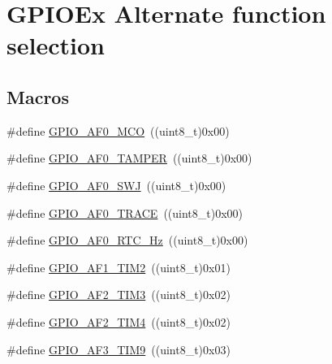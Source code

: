 \hypertarget{group___g_p_i_o_ex___alternate__function__selection}{\section{G\-P\-I\-O\-Ex Alternate function selection}
\label{group___g_p_i_o_ex___alternate__function__selection}
}
\subsection*{Macros}
\begin{DoxyCompactItemize}
\item 
\#define \hyperlink{group___g_p_i_o_ex___alternate__function__selection_ga2c2c2ebb2b09db35be06740566eeda5d}{G\-P\-I\-O\-\_\-\-A\-F0\-\_\-\-M\-C\-O}~((uint8\-\_\-t)0x00)
\item 
\#define \hyperlink{group___g_p_i_o_ex___alternate__function__selection_ga182a9c4d59db0aa5ab63a1b133ebe495}{G\-P\-I\-O\-\_\-\-A\-F0\-\_\-\-T\-A\-M\-P\-E\-R}~((uint8\-\_\-t)0x00)
\item 
\#define \hyperlink{group___g_p_i_o_ex___alternate__function__selection_gaa2f012907797b7a0d3ef1831cb8f013f}{G\-P\-I\-O\-\_\-\-A\-F0\-\_\-\-S\-W\-J}~((uint8\-\_\-t)0x00)
\item 
\#define \hyperlink{group___g_p_i_o_ex___alternate__function__selection_gab8c8f038d314b7bf2d62bce189d45877}{G\-P\-I\-O\-\_\-\-A\-F0\-\_\-\-T\-R\-A\-C\-E}~((uint8\-\_\-t)0x00)
\item 
\#define \hyperlink{group___g_p_i_o_ex___alternate__function__selection_ga93a65e75bfe22810f2e8f8eff9b3618b}{G\-P\-I\-O\-\_\-\-A\-F0\-\_\-\-R\-T\-C\-\_\-Hz}~((uint8\-\_\-t)0x00)
\item 
\#define \hyperlink{group___g_p_i_o_ex___alternate__function__selection_ga4a124b0badec1580f1581a5fccd32ade}{G\-P\-I\-O\-\_\-\-A\-F1\-\_\-\-T\-I\-M2}~((uint8\-\_\-t)0x01)
\item 
\#define \hyperlink{group___g_p_i_o_ex___alternate__function__selection_ga41e7dab432740a5fff4084890764242f}{G\-P\-I\-O\-\_\-\-A\-F2\-\_\-\-T\-I\-M3}~((uint8\-\_\-t)0x02)
\item 
\#define \hyperlink{group___g_p_i_o_ex___alternate__function__selection_gaea624d501cf9bbc28e01bcba9270b895}{G\-P\-I\-O\-\_\-\-A\-F2\-\_\-\-T\-I\-M4}~((uint8\-\_\-t)0x02)
\item 
\#define \hyperlink{group___g_p_i_o_ex___alternate__function__selection_ga957c5bf2ee31ad216b6f152c5fac2b6b}{G\-P\-I\-O\-\_\-\-A\-F3\-\_\-\-T\-I\-M9}~((uint8\-\_\-t)0x03)

\end{DoxyCompactItemize}
